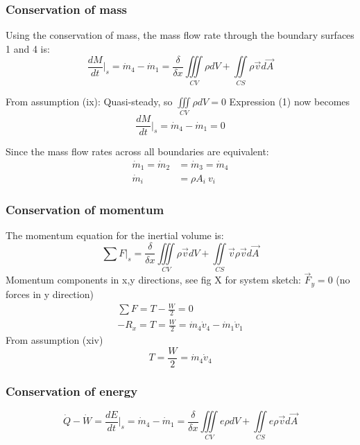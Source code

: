 \subsubsection*{Conservation of mass}
Using the conservation of mass, the mass flow rate through the boundary surfaces 1 and 4 is:
\begin{equation}
\frac{dM}{dt}\bigg|_s= \dot{m}_4 - \dot{m}_1 = 
\frac{\delta}{\delta x} \iiint\limits_{CV}\rho dV +\iint\limits_{CS} \rho  \overrightarrow{v}d \overrightarrow{A} 
\end{equation}

From assumption (ix): Quasi-steady, so $\iiint\limits_{CV}\rho dV = 0$
Expression (1) now becomes 
$$ \frac{dM}{dt}\bigg|_s= \dot{m}_4 - \dot{m}_1 =0 $$

Since the mass flow rates across all boundaries are equivalent:
\begin{align}
\dot{m}_1 = \dot{m}_2 &= \dot{m}_3 = \dot{m}_4 \\
\dot{m}_i &= \rho A_i\ v_i
\end{align}

\subsubsection*{Conservation of momentum}
The momentum equation for the inertial volume is:
\begin{equation}
\sum F\big|_s= 
\frac{\delta}{\delta x} \iiint\limits_{CV}\rho \overrightarrow{v} dV +\iint\limits_{CS} \overrightarrow{v}\rho  \overrightarrow{v}d \overrightarrow{A} 
\end{equation}
Momentum components in x,y directions, see fig X for system sketch: $ \overrightarrow{F}_y =0  $ (no forces in y direction)
\begin{align}
\sum F = T - \frac{W}{2} = 0\\
-R_x = T = \frac{W}{2} =  \dot{m}_4 \dot{v}_4 -  \dot{m}_1 \dot{v}_1
\end{align}
From assumption (xiv)
\begin{equation}
T = \frac{W}{2} =  \dot{m}_4 \dot{v}_4
\end{equation}
\subsubsection*{Conservation of energy}
\begin{equation}
\dot{Q} - \dot{W} =
\frac{dE}{dt}\bigg|_s= \dot{m}_4 - \dot{m}_1 = 
\frac{\delta}{\delta x} \iiint\limits_{CV}e \rho dV +\iint\limits_{CS} e\rho  \overrightarrow{v}d \overrightarrow{A} 
\end{equation}

